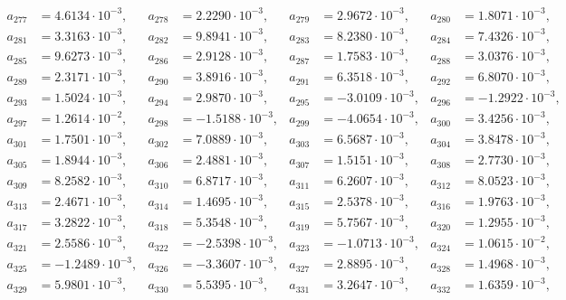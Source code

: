 \begin{align*}
a_{ 277 } &= 4.6134 \cdot 10^{ -3 }, & a_{ 278 } &= 2.2290 \cdot 10^{ -3 }, & a_{ 279 } &= 2.9672 \cdot 10^{ -3 }, & a_{ 280 } &= 1.8071 \cdot 10^{ -3 },\\ 
a_{ 281 } &= 3.3163 \cdot 10^{ -3 }, & a_{ 282 } &= 9.8941 \cdot 10^{ -3 }, & a_{ 283 } &= 8.2380 \cdot 10^{ -3 }, & a_{ 284 } &= 7.4326 \cdot 10^{ -3 },\\ 
a_{ 285 } &= 9.6273 \cdot 10^{ -3 }, & a_{ 286 } &= 2.9128 \cdot 10^{ -3 }, & a_{ 287 } &= 1.7583 \cdot 10^{ -3 }, & a_{ 288 } &= 3.0376 \cdot 10^{ -3 },\\ 
a_{ 289 } &= 2.3171 \cdot 10^{ -3 }, & a_{ 290 } &= 3.8916 \cdot 10^{ -3 }, & a_{ 291 } &= 6.3518 \cdot 10^{ -3 }, & a_{ 292 } &= 6.8070 \cdot 10^{ -3 },\\ 
a_{ 293 } &= 1.5024 \cdot 10^{ -3 }, & a_{ 294 } &= 2.9870 \cdot 10^{ -3 }, & a_{ 295 } &= -3.0109 \cdot 10^{ -3 }, & a_{ 296 } &= -1.2922 \cdot 10^{ -3 },\\ 
a_{ 297 } &= 1.2614 \cdot 10^{ -2 }, & a_{ 298 } &= -1.5188 \cdot 10^{ -3 }, & a_{ 299 } &= -4.0654 \cdot 10^{ -3 }, & a_{ 300 } &= 3.4256 \cdot 10^{ -3 },\\ 
a_{ 301 } &= 1.7501 \cdot 10^{ -3 }, & a_{ 302 } &= 7.0889 \cdot 10^{ -3 }, & a_{ 303 } &= 6.5687 \cdot 10^{ -3 }, & a_{ 304 } &= 3.8478 \cdot 10^{ -3 },\\ 
a_{ 305 } &= 1.8944 \cdot 10^{ -3 }, & a_{ 306 } &= 2.4881 \cdot 10^{ -3 }, & a_{ 307 } &= 1.5151 \cdot 10^{ -3 }, & a_{ 308 } &= 2.7730 \cdot 10^{ -3 },\\ 
a_{ 309 } &= 8.2582 \cdot 10^{ -3 }, & a_{ 310 } &= 6.8717 \cdot 10^{ -3 }, & a_{ 311 } &= 6.2607 \cdot 10^{ -3 }, & a_{ 312 } &= 8.0523 \cdot 10^{ -3 },\\ 
a_{ 313 } &= 2.4671 \cdot 10^{ -3 }, & a_{ 314 } &= 1.4695 \cdot 10^{ -3 }, & a_{ 315 } &= 2.5378 \cdot 10^{ -3 }, & a_{ 316 } &= 1.9763 \cdot 10^{ -3 },\\ 
a_{ 317 } &= 3.2822 \cdot 10^{ -3 }, & a_{ 318 } &= 5.3548 \cdot 10^{ -3 }, & a_{ 319 } &= 5.7567 \cdot 10^{ -3 }, & a_{ 320 } &= 1.2955 \cdot 10^{ -3 },\\ 
a_{ 321 } &= 2.5586 \cdot 10^{ -3 }, & a_{ 322 } &= -2.5398 \cdot 10^{ -3 }, & a_{ 323 } &= -1.0713 \cdot 10^{ -3 }, & a_{ 324 } &= 1.0615 \cdot 10^{ -2 },\\ 
a_{ 325 } &= -1.2489 \cdot 10^{ -3 }, & a_{ 326 } &= -3.3607 \cdot 10^{ -3 }, & a_{ 327 } &= 2.8895 \cdot 10^{ -3 }, & a_{ 328 } &= 1.4968 \cdot 10^{ -3 },\\ 
a_{ 329 } &= 5.9801 \cdot 10^{ -3 }, & a_{ 330 } &= 5.5395 \cdot 10^{ -3 }, & a_{ 331 } &= 3.2647 \cdot 10^{ -3 }, & a_{ 332 } &= 1.6359 \cdot 10^{ -3 },\\ 

\end{align*}
